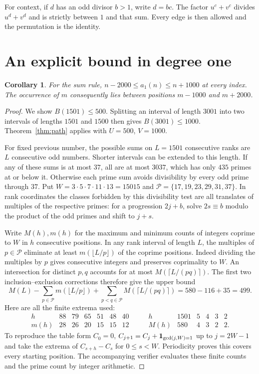 \documentclass[11pt,letterpaper]{article}
\newtheorem{corollary}[theorem]{Corollary}
\begin{document}
For context, if $d$ has an odd divisor $b>1$, write $d=bc$. The factor $u^c+v^c$ divides $u^d+v^d$ and is strictly between $1$ and that sum. Every edge is then allowed and the permutation is the identity.

\section{An explicit bound in degree one}
\begin{corollary}
For the sum rule, $n-2000\le a_1(n)\le n+1000$ at every index. The occurrence of $m$ consequently lies between positions $m-1000$ and $m+2000$.
\end{corollary}
\begin{proof}
We show $B(1501)\le500$. Splitting an interval of length $3001$ into two intervals of lengths $1501$ and $1500$ then gives $B(3001)\le1000$. Theorem~\ref{thm:path} applies with $U=500$, $V=1000$.

For fixed previous number, the possible sums on $L=1501$ consecutive ranks are $L$ consecutive odd numbers. Shorter intervals can be extended to this length. If any of these sums is at most $37$, all are at most $3037$, which has only $435$ primes at or below it. Otherwise each prime sum avoids divisibility by every odd prime through $37$. Put $W=3\cdot5\cdot7\cdot11\cdot13=15015$ and $\mathcal P=\{17,19,23,29,31,37\}$. In rank coordinates the classes forbidden by this divisibility test are all translates of multiples of the respective primes: for a progression $2j+b$, solve $2s\equiv b$ modulo the product of the odd primes and shift to $j+s$.

Write $M(h),m(h)$ for the maximum and minimum counts of integers coprime to $W$ in $h$ consecutive positions. In any rank interval of length $L$, the multiples of $p\in\mathcal P$ eliminate at least $m(\lfloor L/p\rfloor)$ of the coprime positions. Indeed dividing the multiples by $p$ gives consecutive integers and preserves coprimality to $W$. An intersection for distinct $p,q$ accounts for at most $M(\lceil L/(pq)\rceil)$. The first two inclusion--exclusion corrections therefore give the upper bound
\[
 M(L)-\sum_{p\in\mathcal P}m(\lfloor L/p\rfloor)
       +\sum_{p<q\in\mathcal P}M(\lceil L/(pq)\rceil)=580-116+35=499.
\]
Here are all the finite extrema used:
\[
\begin{array}{c|rrrrrr}
 h&88&79&65&51&48&40\\\hline m(h)&28&26&20&15&15&12
\end{array}
\qquad
\begin{array}{c|rrrrr}
 h&1501&5&4&3&2\\\hline M(h)&580&4&3&2&2 .
\end{array}
\]
To reproduce the table form $C_0=0$, $C_{j+1}=C_j+{\bf1}_{\gcd(j,W)=1}$ up to $j=2W-1$ and take the extrema of $C_{s+h}-C_s$ for $0\le s<W$. Periodicity proves this covers every starting position. The accompanying verifier evaluates these finite counts and the prime count by integer arithmetic.
\end{proof}
\end{document}
